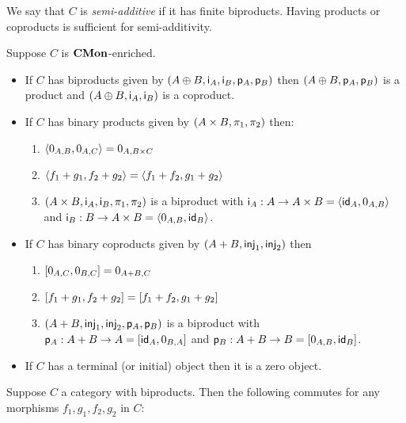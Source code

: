 \noindent We say that $C$ is \emph{semi-additive} if it has finite biproducts. Having products or coproducts
is sufficient for semi-additivity.

\begin{proposition}
\label{prop:biproduct:from-product-or-coproduct}
Suppose $C$ is $\mathbf{CMon}$-enriched.
\begin{itemize}
\item If $C$ has biproducts given by $(A \oplus B, \mathsf{i}_A, \mathsf{i}_B, \mathsf{p}_A, \mathsf{p}_B)$ then $(A
\oplus B, \mathsf{p}_A, \mathsf{p}_B)$ is a product and $(A \oplus B, \mathsf{i}_A, \mathsf{i}_B)$ is a coproduct.
\item If $C$ has binary products given by $(A \times B, \pi_1, \pi_2)$ then:
\begin{enumerate}
\item $\langle 0_{A,B}, 0_{A,C}\rangle = 0_{A,B \times C}$
\item $\langle f_1 + g_1, f_2 + g_2\rangle = \langle f_1 + f_2, g_1 + g_2\rangle$
\item $(A \times B, \mathsf{i}_A, \mathsf{i}_B, \pi_1, \pi_2)$ is a
biproduct with $\mathsf{i}_A: A \to A \times B = \langle \mathsf{id}_A, 0_{A,B}\rangle$ and $\mathsf{i}_B: B \to A \times B =
\langle 0_{A,B}, \mathsf{id}_B\rangle$.
\end{enumerate}
\item If $C$ has binary coproducts given by $(A + B, \mathsf{inj}_1, \mathsf{inj}_2)$ then
\begin{enumerate}
\item $[0_{A,C}, 0_{B,C}] = 0_{A + B,C}$
\item $[f_1 + g_1, f_2 + g_2] = [f_1 + f_2, g_1 + g_2]$
\item $(A + B, \mathsf{inj}_1, \mathsf{inj}_2, \mathsf{p}_A, \mathsf{p}_B)$ is a
biproduct with $\mathsf{p}_A: A + B \to A = [\mathsf{id}_A, 0_{B,A}]$ and $\mathsf{p}_B: A + B \to B =
[0_{A,B}, \mathsf{id}_B]$.
\end{enumerate}
\item If $C$ has a terminal (or initial) object then it is a zero object.
\end{itemize}
\end{proposition}

\begin{proposition}
\label{prop:biproduct:prod-coprod}
Suppose $C$ a category with biproducts. Then the following commutes for any morphisms $f_1, g_1, f_2,
g_2$ in $C$:

\begin{center}
\end{center}
\end{proposition}
